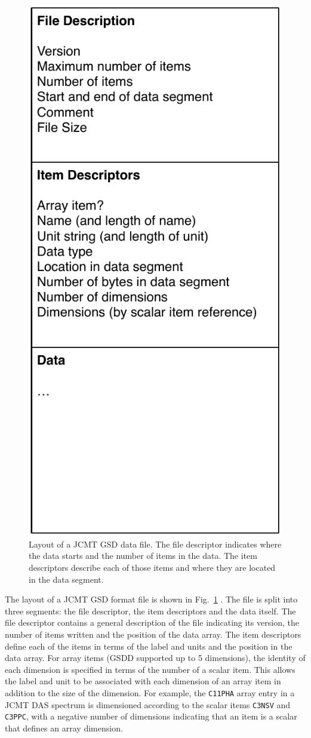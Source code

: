 \documentclass[final,authoryear,5p,times,twocolumn]{elsarticle}
\begin{document}
\begin{figure}
\begin{center}
\includegraphics[width=0.5\columnwidth]{gsd-file-layout}
\end{center}
\caption{Layout of a JCMT GSD data file. The file descriptor indicates
where the data starts and the number of items in the data. The item
descriptors describe each of those items and where they are located in
the data segment.}
\label{fig:jcmtgsd}
\end{figure}

The layout of a JCMT GSD format file is shown in
Fig.~\ref{fig:jcmtgsd} \citep[see also][]{mtdn84}. The file is split
into three segments: the file descriptor, the item descriptors and the
data itself. The file descriptor contains a general description of the
file indicating its version, the number of items written and the
position of the data array. The item descriptors define each of the
items in terms of the label and units and the position in the data
array. For array items (GSDD supported up to 5 dimensions), the
identity of each dimension is specified in terms of the number of a
scalar item. This allows the label and unit to be associated with each
dimension of an array item in addition to the size of the
dimension. For example, the \texttt{C11PHA} array entry in a JCMT DAS
spectrum \citep{1986SPIE..598..134B} is dimensioned according to the
scalar items \texttt{C3NSV} and \texttt{C3PPC}, with a negative number
of dimensions indicating that an item is a scalar that defines an
array dimension.
\end{document}
